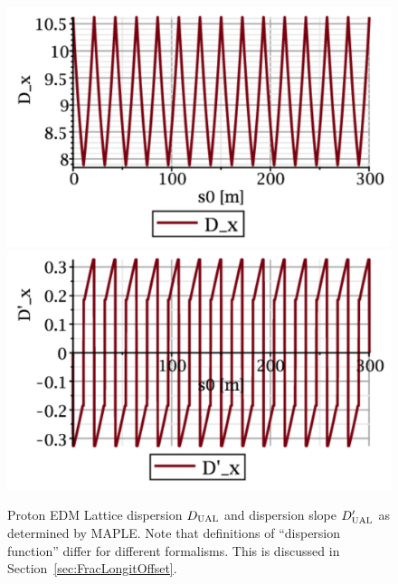 \documentclass[12]{article}
\begin{document}
\begin{figure}[hbt]
\centering
\includegraphics[scale=0.4]{pdf/dispersion.pdf}
\includegraphics[scale=0.4]{pdf/dispersionp.pdf}
\caption{\label{fig:MAPLE-dispersion}Proton EDM Lattice dispersion $D_{\rm UAL}$ 
and dispersion slope $D'_{\rm UAL}$ 
as determined by MAPLE. Note that definitions of ``dispersion function'' differ
for different formalisms. This is discussed in Section~\ref{sec:FracLongitOffset}.}
\end{figure}
\end{document}

